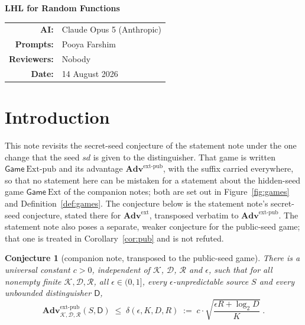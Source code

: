 \documentclass[11pt,a4paper]{article}
\makeatletter
\theoremstyle{plain}
\newtheorem{conjecture}[theorem]{Conjecture}
\theoremstyle{definition}
\theoremstyle{remark}
\newcommand{\Adv}{\mathbf{Adv}}
\newcommand{\Gm}{\mathsf{Game}}
\newcommand{\Ext}{\mathrm{Ext}}
\newcommand{\Extp}{\mathrm{Ext}\text{-}\mathrm{pub}}
\newcommand{\ext}{\mathrm{ext}}
\newcommand{\extp}{\mathrm{ext}\text{-}\mathrm{pub}}
\newcommand{\sd}{\mathit{sd}}
\newcommand{\calK}{\mathcal{K}}
\newcommand{\calD}{\mathcal{D}}
\newcommand{\calR}{\mathcal{R}}
\newcommand{\AIModelsUsed}{Claude Opus 5 (Anthropic)}
\newcommand{\PromptedBy}{Pooya Farshim}
\newcommand{\ReviewedBy}{Nobody}
\newcommand{\PaperDate}{14 August 2026}
\newcommand{\AIDisclosure}{%
  \begingroup
  \small\centering
  \begin{tabular}{@{}rl@{}}
    \textbf{AI:} & \AIModelsUsed \\
    \textbf{Prompts:} & \PromptedBy \\
    \textbf{Reviewers:} & \ReviewedBy \\
    \textbf{Date:} & \PaperDate \\
  \end{tabular}
  \par
  \endgroup
}
\makeatother
\begin{document}
\begin{center}
{\Large\bfseries LHL for Random Functions}
\end{center}

\AIDisclosure

\vspace{1em}

\section{Introduction}\label{sec:intro}

This note revisits the secret-seed conjecture of the statement note under the one change that the
seed $\sd$ is given to the distinguisher. That game is written $\Gm\ \Extp$ and its advantage
$\Adv^{\extp}$, with the suffix carried everywhere, so that no statement here can be mistaken for
a statement about the hidden-seed game $\Gm\ \Ext$ of the companion notes; both are set out in
Figure~\ref{fig:games} and Definition~\ref{def:games}. The conjecture below is the statement
note's secret-seed conjecture, stated there for $\Adv^{\ext}$, transposed verbatim to
$\Adv^{\extp}$. The statement note also poses a separate, weaker conjecture for the public-seed
game; that one is treated in Corollary~\ref{cor:pub} and is not refuted.

\begin{conjecture}[companion note, transposed to the public-seed game]\label{conj:main}
There is a universal constant $c > 0$, independent of $\calK$, $\calD$, $\calR$ and $\epsilon$, such
that for all nonempty finite $\calK, \calD, \calR$, all $\epsilon \in (0,1]$, every
$\epsilon$-unpredictable source $S$ and every unbounded distinguisher $\mathsf{D}$,
\[
  \Adv^{\extp}_{\calK,\calD,\calR}(S,\mathsf{D})
  \;\le\; \delta(\epsilon,K,D,R)
  \;:=\; c \cdot \sqrt{\frac{\epsilon R + \log_2 D}{K}} \; .
\]
\end{conjecture}
\end{document}
